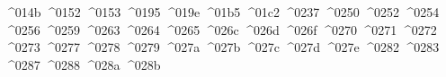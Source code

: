 {  ^^^^014b%
  ^^^^0152%
  ^^^^0153%
  ^^^^0195%
  ^^^^019e%
  ^^^^01b5%
  ^^^^01c2%
  ^^^^0237%
  ^^^^0250%
  ^^^^0252%
  ^^^^0254%
  ^^^^0256%
  ^^^^0259%
  ^^^^0263%
  ^^^^0264%
  ^^^^0265%
  ^^^^026c%
  ^^^^026d%
  ^^^^026f%
  ^^^^0270%
  ^^^^0271%
  ^^^^0272%
  ^^^^0273%
  ^^^^0277%
  ^^^^0278%
  ^^^^0279%
  ^^^^027a%
  ^^^^027b%
  ^^^^027c%
  ^^^^027d%
  ^^^^027e%
  ^^^^0282%
  ^^^^0283%
  ^^^^0287%
  ^^^^0288%
  ^^^^028a%
  ^^^^028b%
}
